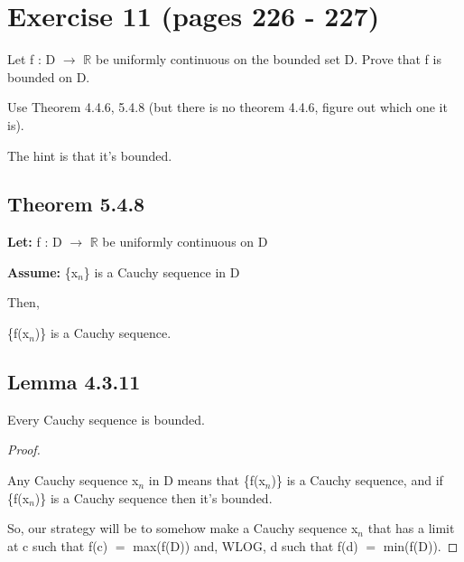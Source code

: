 \documentclass{article}
\newcommand{\mt}[1]{\ensuremath{#1}}
\newcommand\bsc[2][\DefaultOpt]{%
  \def\DefaultOpt{#2}%
  \section[#1]{#2}%
}
\newcommand\ssc[2][\DefaultOpt]{%
  \def\DefaultOpt{#2}%
  \subsection[#1]{#2}%
}
\newcommand{\bgpf}{\begin{proof} $ $\newline}
\newcommand{\lt}[1]{\textbf{Let: } #1}
\newcommand{\as}[1]{\textbf{Assume: } #1}
\newcommand{\epf}{\end{proof}}
\newcommand{\br}{\mt{\mathbb{R}} }       %
\newcommand{\lra}{ \mt{\longrightarrow} } %
\newcommand{\bk}[1]{\{#1\}}
\newcommand{\eql}{\mt{=} }
\newcommand{\uw}[2]{#1\mt{_{#2}}}
\begin{document}
\bsc{Exercise 11 (pages 226 - 227)}{

Let f : D \lra \br be uniformly continuous on the bounded set D. Prove that f is bounded on D. 

Use Theorem 4.4.6, 5.4.8 (but there is no theorem 4.4.6, figure out which one it is).

The hint is that it's bounded.

\ssc{Theorem 5.4.8}{

\lt{f : D \lra \br be uniformly continuous on D}

\as{\bk{\uw{x}{n}} is a Cauchy sequence in D}

Then,

\bk{f(\uw{x}{n})} is a Cauchy sequence.
}

\ssc{Lemma 4.3.11}{
Every Cauchy sequence is bounded.
}

\bgpf

Any Cauchy sequence \uw{x}{n} in D means that \bk{f(\uw{x}{n})} is a Cauchy sequence, and if \bk{f(\uw{x}{n})} is a Cauchy sequence then it's bounded.

So, our strategy will be to somehow make a Cauchy sequence \uw{x}{n} that has a limit at c such that f(c) \eql max(f(D)) and, WLOG, d such that f(d) \eql min(f(D)).

\epf


}
\end{document}
